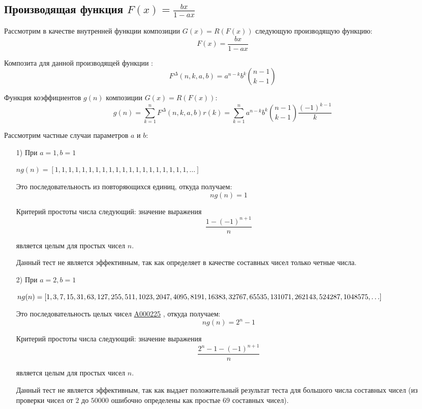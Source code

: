 \documentclass[
russian,
cp1251,
14pt,
simple
]{eskdtext}
\theoremstyle{definition}
\begin{document}
\subsection{Производящая функция $F(x)=\frac{bx}{1 - ax}$}
Рассмотрим в качестве внутренней функции композиции $G(x)=R(F(x))$ следующую производящую функцию:
$$
F(x)=\frac{bx}{1 - ax}
$$

Композита для данной производящей функции \cite{KruchininVV}:
$$
F^\Delta(n,k,a,b)=a^{n - k}b^{k}{n - 1 \choose k - 1}
$$

Функция коэффициентов $g(n)$ композиции $G(x)=R(F(x))$:
$$
g(n)=\sum\limits _{k=1}^{n}{F^\Delta(n,k,a,b)r(k)}=\sum\limits _{k=1}^{n}{a^{n - k}b^{k}{n - 1 \choose k - 1}\frac{(-1)^{k-1}}{k}}
$$

Рассмотрим частные случаи параметров $a$ и $b$:
\begin{itemize}
\item[1)] При $a=1, b=1$

\begin{math}
ng(n)=[1,1,1,1,1,1,1,1,1,1,1,1,1,1,1,1,1,1,1,1,\ldots]
\end{math}

Это последовательность из повторяющихся единиц, откуда получаем:
$$
ng(n)= 1
$$

Критерий простоты числа следующий: значение выражения
$$
\frac{1-(-1)^{n+1}}{n}
$$

является целым для простых чисел $n$.

Данный тест не является эффективным, так как определяет в качестве составных чисел только четные числа.

\item[2)] При $a=2, b=1$

\begin{math}
ng(n)=[1,3,7,15,31,63,127,255,511,1023,2047,4095,8191,16383,\\
32767,65535,131071,262143,524287,1048575,\ldots]
\end{math}

Это последовательность целых чисел \href{http://oeis.org/A000225}{A000225} \cite{oeis}, откуда получаем:
$$
ng(n)=2^n - 1
$$

Критерий простоты числа следующий: значение выражения
$$
\frac{2^n - 1 - (-1)^{n + 1}}{n}
$$

является целым для простых чисел $n$.

Данный тест не является эффективным, так как выдает положительный результат теста для большого числа составных чисел (из проверки чисел от $2$ до $50000$ ошибочно определены как простые $69$ составных чисел).


\end{itemize}
\end{document}
